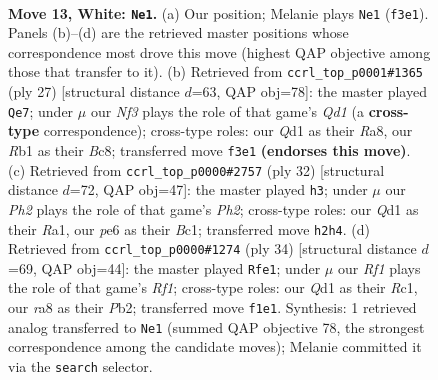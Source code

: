 \documentclass[11pt]{article}
\begin{document}
\clearpage

\begin{figure}[p]\centering
\begin{subfigure}{0.46\textwidth}\centering
\resizebox{\linewidth}{!}{%
\newchessgame
\chessboard[
  setfen={rnbq1rk1/pp3ppp/4p3/2P4n/2P5/3BPN2/P4PPP/1RBQ1RK1 w - - 3 13},
  showmover=false,
  pgfstyle=straightmove, color=movearrow, markmove={f3-e1}
]}
\caption{}
\end{subfigure}\hfill
\begin{subfigure}{0.46\textwidth}\centering
\resizebox{\linewidth}{!}{%
\newchessgame
\chessboard[
  setfen={r1bq1rk1/pp3ppp/3b1n2/1P2p3/2B5/4PN1P/P4PP1/R1BQ1RK1 b - - 0 14},
  showmover=false,
  pgfstyle=straightmove, color=movearrow, markmove={d8-e7}
]}
\caption{}
\end{subfigure}
\\[4pt]
\begin{subfigure}{0.46\textwidth}\centering
\resizebox{\linewidth}{!}{%
\newchessgame
\chessboard[
  setfen={r4r1k/p2bb1pp/1qpp1n2/4p3/2P5/5N2/PP2BPPP/R1BQ1RK1 w - - 5 17},
  showmover=false,
  pgfstyle=straightmove, color=movearrow, markmove={h2-h3}
]}
\caption{}
\end{subfigure}\hfill
\begin{subfigure}{0.46\textwidth}\centering
\resizebox{\linewidth}{!}{%
\newchessgame
\chessboard[
  setfen={r1r3k1/pb1nqppp/1p2p3/3n4/2BP4/5NBP/PP2QPP1/2R2RK1 w - - 7 18},
  showmover=false,
  pgfstyle=straightmove, color=movearrow, markmove={f1-e1}
]}
\caption{}
\end{subfigure}
\caption{\textbf{Move 13, White: \texttt{Ne1}.} (a) Our position; Melanie plays \texttt{Ne1} (\texttt{f3e1}). Panels (b)--(d) are the retrieved master positions whose correspondence most drove this move (highest QAP objective among those that transfer to it). (b) Retrieved from \texttt{ccrl\_top\_p0001\#1365} (ply 27) [structural distance $d$=63, QAP obj=78]: the master played \texttt{Qe7}; under $\mu$ our \emph{Nf3} plays the role of that game's \emph{Qd1} (a \textbf{cross-type} correspondence); cross-type roles: our \emph{Q}d1 as their \emph{R}a8, our \emph{R}b1 as their \emph{B}c8; transferred move \texttt{f3e1} \textbf{(endorses this move)}. (c) Retrieved from \texttt{ccrl\_top\_p0000\#2757} (ply 32) [structural distance $d$=72, QAP obj=47]: the master played \texttt{h3}; under $\mu$ our \emph{Ph2} plays the role of that game's \emph{Ph2}; cross-type roles: our \emph{Q}d1 as their \emph{R}a1, our \emph{p}e6 as their \emph{B}c1; transferred move \texttt{h2h4}. (d) Retrieved from \texttt{ccrl\_top\_p0000\#1274} (ply 34) [structural distance $d$=69, QAP obj=44]: the master played \texttt{Rfe1}; under $\mu$ our \emph{Rf1} plays the role of that game's \emph{Rf1}; cross-type roles: our \emph{Q}d1 as their \emph{R}c1, our \emph{r}a8 as their \emph{P}b2; transferred move \texttt{f1e1}. Synthesis: 1 retrieved analog transferred to \texttt{Ne1} (summed QAP objective 78, the strongest correspondence among the candidate moves); Melanie committed it via the \texttt{search} selector.}
\label{fig:thought-m24}
\end{figure}
\end{document}
